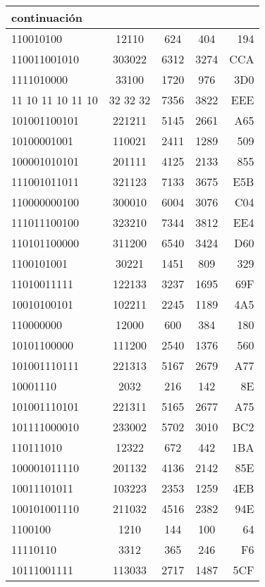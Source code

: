 \documentclass[12pt]{article}
\begin{document}
\begin{center}
\begin{tabular}{||l|c|c|c|r||}

continuaci\'on \\ \hline
110010100 & 12110 & 624 & 404 & 194 \\ \hline
110011001010 & 303022 & 6312 & 3274 & CCA \\ \hline
1111010000 & 33100 & 1720 & 976 & 3D0 \\ \hline
11 10 11 10 11 10 & 32 32 32 & 7356 & 3822 & EEE \\ \hline
101001100101 & 221211 & 5145 & 2661 & A65 \\ \hline
10100001001 & 110021 & 2411 & 1289 & 509 \\ \hline
100001010101 & 201111 & 4125 & 2133 & 855 \\ \hline
111001011011 & 321123 & 7133 & 3675 & E5B \\ \hline
110000000100 & 300010 & 6004 & 3076 & C04 \\ \hline
111011100100 & 323210 & 7344 & 3812 & EE4 \\ \hline
110101100000 & 311200 & 6540 & 3424 & D60 \\ \hline
1100101001 & 30221 & 1451 & 809 & 329 \\ \hline
11010011111 & 122133 & 3237 & 1695 & 69F \\ \hline
10010100101 & 102211 & 2245 & 1189 & 4A5 \\ \hline
110000000 & 12000 & 600 & 384 & 180 \\ \hline
10101100000 & 111200 & 2540 & 1376 & 560 \\ \hline
101001110111 & 221313 & 5167 & 2679 & A77 \\ \hline
10001110 & 2032 & 216 & 142 & 8E \\ \hline
101001110101 & 221311 & 5165 & 2677 & A75 \\ \hline
101111000010 & 233002 & 5702 & 3010 & BC2 \\ \hline
110111010 & 12322 & 672 & 442 & 1BA \\ \hline
100001011110 & 201132 & 4136 & 2142 & 85E \\ \hline
10011101011 & 103223 & 2353 & 1259 & 4EB \\ \hline
100101001110 & 211032 & 4516 & 2382 & 94E \\ \hline
1100100 & 1210 & 144 & 100 & 64 \\ \hline
11110110 & 3312 & 365 & 246 & F6 \\ \hline
10111001111 & 113033 & 2717 & 1487 & 5CF \\ \hline

\end{tabular}
\end{center}
\end{document}
